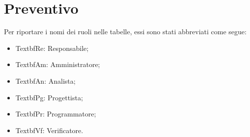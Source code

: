 \section{Preventivo}

Per riportare i nomi dei ruoli nelle tabelle, essi sono stati abbreviati come segue:
\begin{itemize}
  \item Textbf{Re:} Responsabile;
  \item Textbf{Am:} Amministratore;
  \item Textbf{An:} Analista;
  \item Textbf{Pg:} Progettista;
  \item Textbf{Pr:} Programmatore;
  \item Textbf{Vf:} Verificatore.
\end{itemize}






